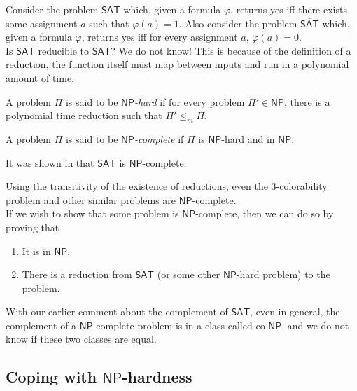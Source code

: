 	Consider the problem $\mathsf{SAT}$ which, given a formula $\varphi$, returns yes iff there exists some assignment $a$ such that $\varphi(a) = 1$. Also consider the problem $\overline{\mathsf{SAT}}$ which, given a formula $\varphi$, returns yes iff for every assignment $a$, $\varphi(a) = 0$. \\
	Is $\mathsf{SAT}$ reducible to $\overline{\mathsf{SAT}}$? We do not know! This is because of the definition of a reduction, the function itself must map between inputs and run in a polynomial amount of time.

	\begin{definition}
		A problem $\mathsf{\Pi}$ is said to be \textit{$\mathsf{NP}$-hard} if for every problem $\mathsf{\Pi}' \in \mathsf{NP}$, there is a polynomial time reduction such that $\mathsf{\Pi}' \leq_m \mathsf{\Pi}$.
	\end{definition}

	\begin{definition}
		A problem $\mathsf{\Pi}$ is said to be \textit{$\mathsf{NP}$-complete} if $\mathsf{\Pi}$ is $\mathsf{NP}$-hard and in $\mathsf{NP}$.
	\end{definition}

	It was shown in \cite{cookSAT,levinSAT} that $\mathsf{SAT}$ is $\mathsf{NP}$-complete.

	Using the transitivity of the existence of reductions, even the $3$-colorability problem and other similar problems are $\mathsf{NP}$-complete.\\
	If we wish to show that some problem is $\mathsf{NP}$-complete, then we can do so by proving that
	\begin{enumerate}
		\item It is in $\mathsf{NP}$.
		\item There is a reduction from $\mathsf{SAT}$ (or some other $\mathsf{NP}$-hard problem) to the problem.
	\end{enumerate}

	With our earlier comment about the complement of $\mathsf{SAT}$, even in general, the complement of a $\mathsf{NP}$-complete problem is in a class called co-$\mathsf{NP}$, and we do not know if these two classes are equal.

\subsection{Coping with \texorpdfstring{$\mathsf{NP}$}{NP}-hardness}

